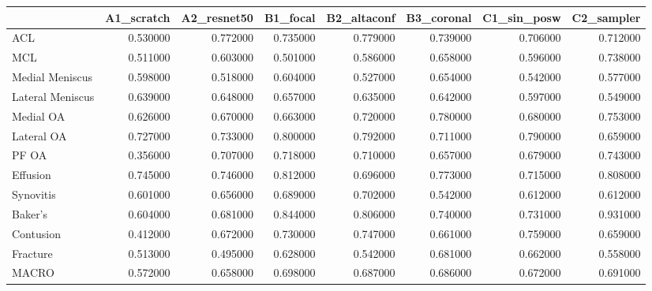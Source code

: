 \begin{tabular}{lrrrrrrr}
\toprule
 & A1\_scratch & A2\_resnet50 & B1\_focal & B2\_altaconf & B3\_coronal & C1\_sin\_posw & C2\_sampler \\
\midrule
ACL & 0.530000 & 0.772000 & 0.735000 & 0.779000 & 0.739000 & 0.706000 & 0.712000 \\
MCL & 0.511000 & 0.603000 & 0.501000 & 0.586000 & 0.658000 & 0.596000 & 0.738000 \\
Medial Meniscus & 0.598000 & 0.518000 & 0.604000 & 0.527000 & 0.654000 & 0.542000 & 0.577000 \\
Lateral Meniscus & 0.639000 & 0.648000 & 0.657000 & 0.635000 & 0.642000 & 0.597000 & 0.549000 \\
Medial OA & 0.626000 & 0.670000 & 0.663000 & 0.720000 & 0.780000 & 0.680000 & 0.753000 \\
Lateral OA & 0.727000 & 0.733000 & 0.800000 & 0.792000 & 0.711000 & 0.790000 & 0.659000 \\
PF OA & 0.356000 & 0.707000 & 0.718000 & 0.710000 & 0.657000 & 0.679000 & 0.743000 \\
Effusion & 0.745000 & 0.746000 & 0.812000 & 0.696000 & 0.773000 & 0.715000 & 0.808000 \\
Synovitis & 0.601000 & 0.656000 & 0.689000 & 0.702000 & 0.542000 & 0.612000 & 0.612000 \\
Baker's & 0.604000 & 0.681000 & 0.844000 & 0.806000 & 0.740000 & 0.731000 & 0.931000 \\
Contusion & 0.412000 & 0.672000 & 0.730000 & 0.747000 & 0.661000 & 0.759000 & 0.659000 \\
Fracture & 0.513000 & 0.495000 & 0.628000 & 0.542000 & 0.681000 & 0.662000 & 0.558000 \\
MACRO & 0.572000 & 0.658000 & 0.698000 & 0.687000 & 0.686000 & 0.672000 & 0.691000 \\
\bottomrule
\end{tabular}
